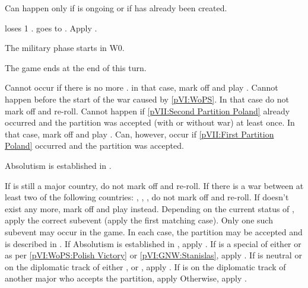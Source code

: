 \condition{}
\aparag Can happen only if  is ongoing or if
\paysusa has already been created.

\phevnt
\aparag \FRA loses 1 \STAB.
\aparag \FRA goes to \monarqueTerror. Apply
.

\phmil
\aparag The military phase starts in W0.

\phpaix
\aparag The game ends at the end of this turn.





\condition{}
\aparag Cannot occur if there is no more \payspologne. in that case, mark off
and play \RD.
\aparag Cannot happen before the start of the war caused by \ref{pVI:WoPS}. In
that case do not mark off and re-roll.
\aparag Cannot happen if \ref{pVII:Second Partition Poland} already occurred
and the partition was accepted (with or without war) at least once. In that
case, mark off and play \RD.
\bparag Can, however, occur if \ref{pVII:First Partition Poland} occurred and
the partition was accepted.

\phevnt
\aparag Absolutism is established in \payspologne.





\condition{}
\aparag If \POL is still a major country, do not mark off and re-roll.
\aparag If there is a war between at least two of the following countries:
\RUS, \AUS, \PRU, do not mark off and re-roll.
\aparag If \payspologne doesn't exist any more, mark off and play \RD instead.
\aparag Depending on the current status of \payspologne, apply the correct
subevent (apply the first matching case). Only one such subevent may occur in
the game. In each case, the partition may be accepted and is described in
.
\bparag If Absolutism is established in \payspologne, apply
.
\aparag If \payspologne is a special \EG of either \FRA or \SUE as per
\ref{pVI:WoPS:Polish Victory} or \ref{pVI:GNW:Stanislas}, apply
.
\bparag If \payspologne is neutral or on the diplomatic track of either \RUS,
\AUS or \PRU, apply .
\bparag If \payspologne is on the diplomatic track of another major who
accepts the partition, apply 
\bparag Otherwise, apply .


